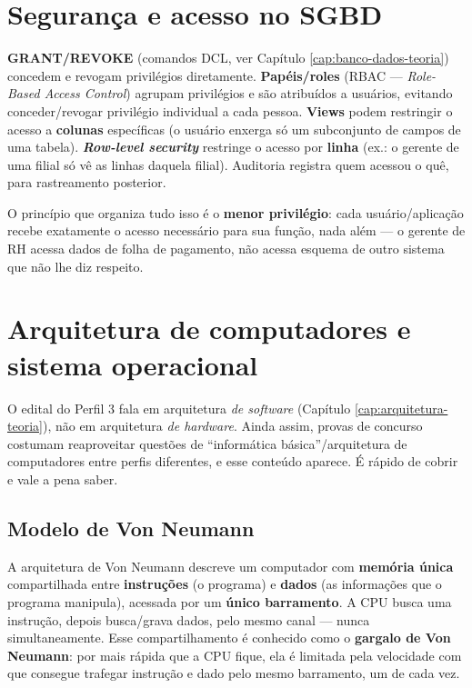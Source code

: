 \section{Segurança e acesso no SGBD}

\begin{conceito}
\textbf{GRANT/REVOKE} (comandos DCL, ver Capítulo
\ref{cap:banco-dados-teoria}) concedem e revogam privilégios diretamente.
\textbf{Papéis/roles} (RBAC --- \textit{Role-Based Access Control}) agrupam
privilégios e são atribuídos a usuários, evitando conceder/revogar
privilégio individual a cada pessoa. \textbf{Views} podem restringir o
acesso a \textbf{colunas} específicas (o usuário enxerga só um subconjunto
de campos de uma tabela). \textit{\textbf{Row-level security}} restringe o
acesso por \textbf{linha} (ex.: o gerente de uma filial só vê as linhas
daquela filial). Auditoria registra quem acessou o quê, para rastreamento
posterior.

O princípio que organiza tudo isso é o \textbf{menor privilégio}: cada
usuário/aplicação recebe exatamente o acesso necessário para sua função,
nada além --- o gerente de RH acessa dados de folha de pagamento, não
acessa esquema de outro sistema que não lhe diz respeito.
\end{conceito}

\section{Arquitetura de computadores e sistema operacional}

\begin{conceito}
O edital do Perfil 3 fala em arquitetura \emph{de software}
(Capítulo \ref{cap:arquitetura-teoria}), não em arquitetura \emph{de
hardware}. Ainda assim, provas de concurso costumam reaproveitar questões
de “informática básica”/arquitetura de computadores entre perfis
diferentes, e esse conteúdo aparece. É rápido de cobrir e vale a pena
saber.
\end{conceito}

\subsection{Modelo de Von Neumann}

\begin{conceito}
A arquitetura de Von Neumann descreve um computador com \textbf{memória
única} compartilhada entre \textbf{instruções} (o programa) e
\textbf{dados} (as informações que o programa manipula), acessada por um
\textbf{único barramento}. A CPU busca uma instrução, depois busca/grava
dados, pelo mesmo canal --- nunca simultaneamente. Esse compartilhamento é
conhecido como o \textbf{gargalo de Von Neumann}: por mais rápida que a CPU
fique, ela é limitada pela velocidade com que consegue trafegar instrução e
dado pelo mesmo barramento, um de cada vez.
\end{conceito}

